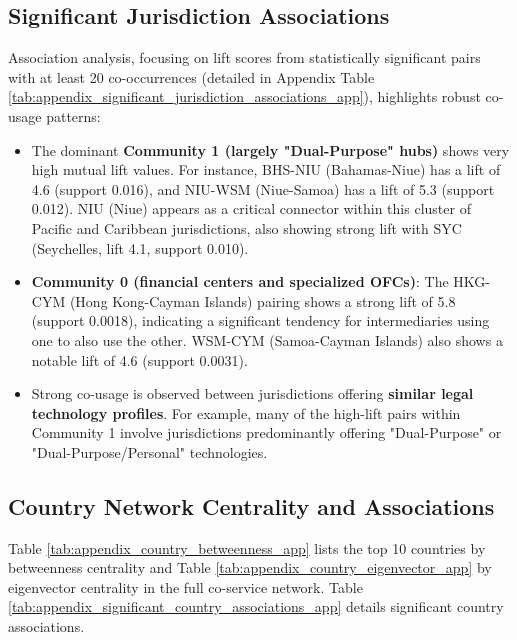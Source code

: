 \subsection{Significant Jurisdiction Associations}
Association analysis, focusing on lift scores from statistically significant pairs with at least 20 co-occurrences (detailed in Appendix Table \ref{tab:appendix_significant_jurisdiction_associations_app}), highlights robust co-usage patterns:
\begin{itemize}
    \item The dominant \textbf{Community 1 (largely "Dual-Purpose" hubs)} shows very high mutual lift values. For instance, BHS-NIU (Bahamas-Niue) has a lift of 4.6 (support 0.016), and NIU-WSM (Niue-Samoa) has a lift of 5.3 (support 0.012). NIU (Niue) appears as a critical connector within this cluster of Pacific and Caribbean jurisdictions, also showing strong lift with SYC (Seychelles, lift 4.1, support 0.010).
    \item \textbf{Community 0 (financial centers and specialized OFCs)}: The HKG-CYM (Hong Kong-Cayman Islands) pairing shows a strong lift of 5.8 (support 0.0018), indicating a significant tendency for intermediaries using one to also use the other. WSM-CYM (Samoa-Cayman Islands) also shows a notable lift of 4.6 (support 0.0031).
    \item Strong co-usage is observed between jurisdictions offering \textbf{similar legal technology profiles}. For example, many of the high-lift pairs within Community 1 involve jurisdictions predominantly offering "Dual-Purpose" or "Dual-Purpose/Personal" technologies.
\end{itemize}


\subsection{Country Network Centrality and Associations}
\label{sec:appendix_country_network}

Table \ref{tab:appendix_country_betweenness_app} lists the top 10 countries by betweenness centrality and Table \ref{tab:appendix_country_eigenvector_app} by eigenvector centrality in the full co-service network. Table \ref{tab:appendix_significant_country_associations_app} details significant country associations.

